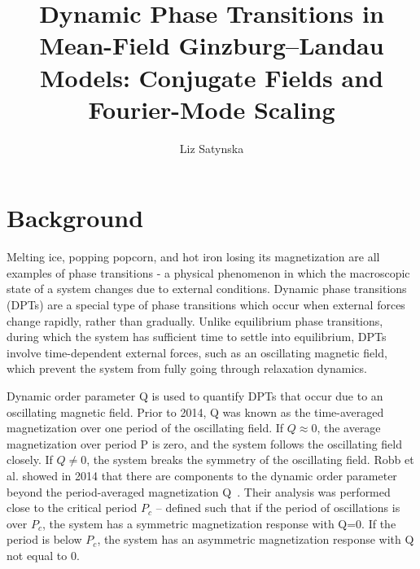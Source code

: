\documentclass{article}
\title{Dynamic Phase Transitions in Mean-Field Ginzburg–Landau Models: Conjugate Fields and Fourier-Mode Scaling}
\author{Liz Satynska}
\date{}
\begin{document}
\maketitle
\section{Background}
Melting ice, popping popcorn, and hot iron losing its magnetization are all examples of phase transitions - a physical phenomenon in which the macroscopic state of a system changes due to external conditions. Dynamic phase transitions (DPTs) are a special type of phase transitions which occur when external forces change rapidly, rather than gradually. Unlike equilibrium phase transitions, during which the system has sufficient time to settle into equilibrium, DPTs involve time-dependent external forces, such as an oscillating magnetic field, which prevent the system from fully going through relaxation dynamics.

Dynamic order parameter Q is used to quantify DPTs that occur due to an oscillating magnetic field. Prior to 2014, Q was known as the time-averaged magnetization over one period of the oscillating field. If $Q\approx0$, the average magnetization over period P is zero, and the system follows the oscillating field closely. If $Q\neq0$, the system breaks the symmetry of the oscillating field. Robb et al. showed in 2014 that there are components to the dynamic order parameter beyond the period-averaged magnetization Q~\cite{2014}. Their analysis was performed close to the critical period $P_c$ -- defined such that if the period of oscillations is over $P_c$, the system has a symmetric magnetization response with Q=0. If the period is below $P_c$, the system has an asymmetric magnetization response with Q not equal to 0.
\end{document}
